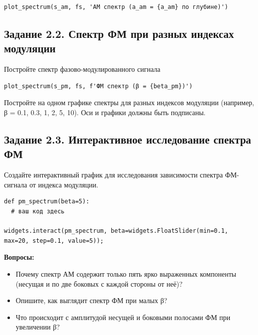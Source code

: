\documentclass[12pt,a4paper,openany]{book}
\providecommand{\tightlist}{\setlength{\itemsep}{0pt}\setlength{\parskip}{0pt}}
\begin{document}
\begin{Verbatim}[fontsize=\small, breaklines, breakanywhere, frame=single, framesep=2mm]
plot_spectrum(s_am, fs, 'АМ спектр (a_am = {a_am} по глубине)')
\end{Verbatim}

\subsection*{Задание 2.2. Спектр ФМ при разных индексах модуляции}

Постройте спектр фазово-модулированного сигнала

\begin{Verbatim}[fontsize=\small, breaklines, breakanywhere, frame=single, framesep=2mm]
plot_spectrum(s_pm, fs, f'ФМ спектр (β = {beta_pm})')
\end{Verbatim}

Постройте на одном графике спектры для разных индексов модуляции (например, β = 0.1, 0.3, 1, 2, 5, 10). Оси и графики должны быть подписаны.

\subsection*{Задание 2.3. Интерактивное исследование спектра ФМ}

Создайте интерактивный график для исследования зависимости спектра ФМ-сигнала от индекса модуляции.

\begin{Verbatim}[fontsize=\small, breaklines, breakanywhere, frame=single, framesep=2mm]
def pm_spectrum(beta=5):
  # ваш код здесь

widgets.interact(pm_spectrum, beta=widgets.FloatSlider(min=0.1, max=20, step=0.1, value=5));
\end{Verbatim}

\textbf{Вопросы:}

\begin{itemize}
\tightlist
\item
  Почему спектр АМ содержит только пять ярко выраженных компоненты (несущая и по две боковых с каждой стороны от неё)?
\item
  Опишите, как выглядит спектр ФМ при малых β?
\item
  Что происходит с амплитудой несущей и боковыми полосами ФМ при увеличении β?
\end{itemize}
\end{document}
